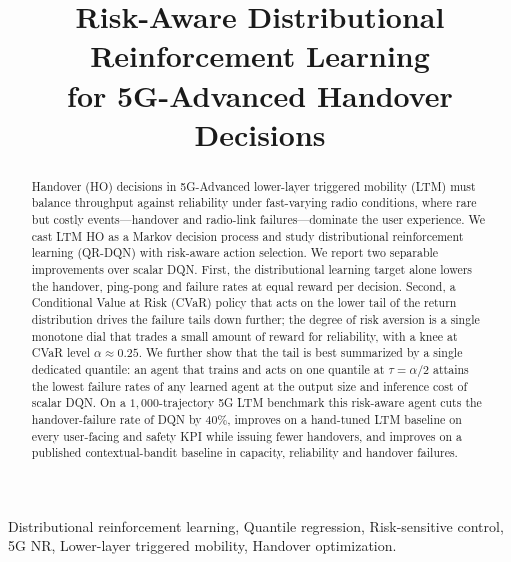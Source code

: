\documentclass[conference]{IEEEtran}
\begin{document}
\title{Risk-Aware Distributional Reinforcement Learning\\for 5G-Advanced Handover Decisions}

\author{
}

\maketitle

\begin{abstract}
Handover (HO) decisions in 5G-Advanced lower-layer triggered mobility (LTM) must
balance throughput against reliability under fast-varying radio conditions, where
rare but costly events---handover and radio-link failures---dominate the user
experience. We cast LTM HO as a Markov decision process and study distributional
reinforcement learning (QR-DQN) with risk-aware action selection. We report two
separable improvements over scalar DQN. First, the distributional learning target
alone lowers the handover, ping-pong and failure rates at equal reward per
decision. Second, a Conditional Value at Risk (CVaR) policy that acts on the lower
tail of the return distribution drives the failure tails down further; the degree
of risk aversion is a single monotone dial that trades a small amount of reward for
reliability, with a knee at CVaR level $\alpha\approx0.25$. We further show that the
tail is best summarized by a single dedicated quantile: an agent that trains and
acts on one quantile at $\tau=\alpha/2$ attains the lowest failure rates of any
learned agent at the output size and inference cost of scalar DQN. On a
$1{,}000$-trajectory 5G LTM benchmark this risk-aware agent cuts the
handover-failure rate of DQN by $40\%$, improves on a hand-tuned LTM
baseline on every user-facing and safety KPI
while issuing fewer handovers, and improves on a published contextual-bandit
baseline in capacity, reliability and handover failures.
\end{abstract}

\begin{IEEEkeywords}
Distributional reinforcement learning, Quantile regression, Risk-sensitive control, 5G NR, Lower-layer triggered mobility,
Handover optimization.
\end{IEEEkeywords}
\end{document}

